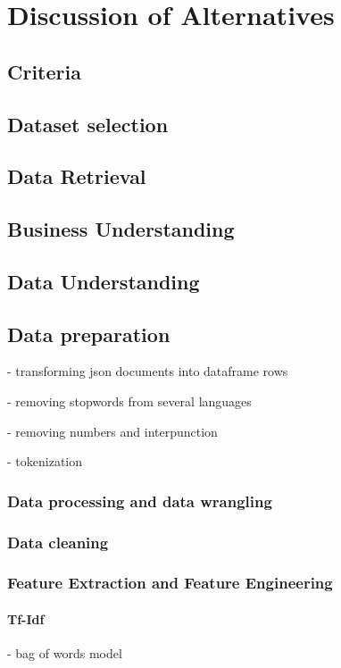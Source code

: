 \chapter{Discussion of Alternatives}
\section{Criteria}
\section{Dataset selection}

\section{Data Retrieval}

\section{Business Understanding}

\section{Data Understanding}

\section{Data preparation}
- transforming json documents into dataframe rows

- removing stopwords from several languages

- removing numbers and interpunction

- tokenization

	\subsection{Data processing and data wrangling}
	
	
	\subsection{Data cleaning}
	
	\subsection{Feature Extraction and Feature Engineering}
		\subsubsection{Tf-Idf}
		- bag of words model
